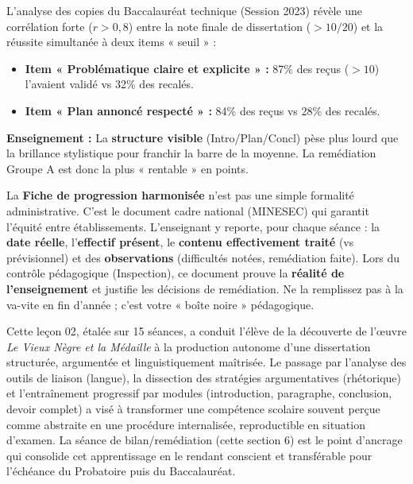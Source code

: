 \documentclass[11pt]{article}
\newcommand{\cle}[1]{{\popxbold\color{popdark}#1}}
\newcounter{popsec}
\newcounter{popsub}
\newcommand{\courssub}[1]{%
  \stepcounter{popsub}%
  \par\vspace{9pt}\noindent{\popxbold\fontsize{11.5}{13}\selectfont\color{popink}{\color{poporange}\thepopsec.\thepopsub}\hspace{6pt}#1}\par\nopagebreak\vspace{4pt}
}
\begin{document}
\begin{exemplebox}
L'analyse des copies du Baccalauréat technique (Session 2023) révèle une corrélation forte ($r > 0{,}8$) entre la note finale de dissertation ($> 10/20$) et la réussite simultanée à deux items « seuil » :
\begin{itemize}
    \item \textbf{Item « Problématique claire et explicite » :} 87\% des reçus ($>10$) l'avaient validé vs 32\% des recalés.
    \item \textbf{Item « Plan annoncé respecté » :} 84\% des reçus vs 28\% des recalés.
\end{itemize}
\textbf{Enseignement :} La \textbf{structure visible} (Intro/Plan/Concl) pèse plus lourd que la brillance stylistique pour franchir la barre de la moyenne. La remédiation Groupe A est donc la plus « rentable » en points.
\end{exemplebox}

\begin{savaistu}
La \textbf{Fiche de progression harmonisée} n'est pas une simple formalité administrative. C'est le document cadre national (MINESEC) qui garantit l'équité entre établissements. L'enseignant y reporte, pour chaque séance : la \textbf{date réelle}, l'\textbf{effectif présent}, le \textbf{contenu effectivement traité} (vs prévisionnel) et des \textbf{observations} (difficultés notées, remédiation faite). Lors du contrôle pédagogique (Inspection), ce document prouve la \textbf{réalité de l'enseignement} et justifie les décisions de remédiation. Ne la remplissez pas à la va-vite en fin d'année ; c'est votre « boîte noire » pédagogique.
\end{savaistu}

\courssub{Bilan de la leçon complète}

Cette leçon 02, étalée sur 15 séances, a conduit l'élève de la découverte de l'œuvre \emph{Le Vieux Nègre et la Médaille} à la production autonome d'une dissertation structurée, argumentée et linguistiquement maîtrisée. Le passage par l'analyse des outils de liaison (langue), la dissection des stratégies argumentatives (rhétorique) et l'entraînement progressif par modules (introduction, paragraphe, conclusion, devoir complet) a visé à transformer une compétence scolaire souvent perçue comme abstraite en une \cle{procédure internalisée}, reproductible en situation d'examen. La séance de bilan/remédiation (cette section 6) est le point d'ancrage qui consolide cet apprentissage en le rendant conscient et transférable pour l'échéance du Probatoire puis du Baccalauréat.
\end{document}
